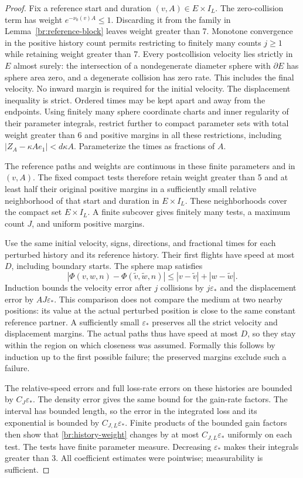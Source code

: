 \begin{proof}
Fix a reference start and duration \((v,A)\in E\times I_L\).
The zero-collision term has weight \(e^{-\nu_0(v)A}\le1\).
Discarding it from the family in Lemma~\ref{br:reference-block}
leaves weight greater than 7. Monotone convergence in the positive
history count permits restricting to finitely many counts
\(j\ge1\) while retaining weight greater than 7. Every postcollision
velocity lies strictly in \(E\) almost surely: the intersection of a
nondegenerate diameter sphere with \(\partial E\) has sphere area zero,
and a degenerate collision has zero rate. This includes the final
velocity. No inward margin is required for the initial velocity.
The displacement inequality
is strict. Ordered times may be kept apart and away from the endpoints.
Using finitely many sphere coordinate charts and inner regularity of
their parameter integrals, restrict further to compact parameter sets
with total weight greater than 6 and positive margins in all these
restrictions, including \(|Z_A-\kappa Ae_1|<d\kappa A\).
Parameterize the times as fractions of \(A\).

The reference paths and weights are continuous in these finite
parameters and in \((v,A)\). The fixed compact tests therefore retain
weight greater than 5 and at least half their original positive
margins in a sufficiently small relative neighborhood of that start
and duration in \(E\times I_L\).
These neighborhoods cover the compact set
\(E\times I_L\). A finite subcover gives finitely many tests, a maximum
count \(J\), and uniform positive margins.

Use the same initial velocity, signs, directions, and fractional times
for each perturbed history and its reference history. Their first
flights have speed at most \(D\), including boundary starts.
The sphere map satisfies
\[
|\Phi(v,w,n)-\Phi(\widetilde v,\widetilde w,n)|
\le |v-\widetilde v|+|w-\widetilde w|.
\]
Induction bounds the velocity error after \(j\) collisions by
\(j\varepsilon_*\) and the displacement error by \(AJ\varepsilon_*\).
This comparison does not compare the medium at two nearby positions:
its value at the actual perturbed position is close to the same
constant reference partner. A sufficiently small \(\varepsilon_*\)
preserves all the strict velocity and displacement margins. The
actual paths thus have speed at most \(D\), so they stay within the
region on which closeness was assumed. Formally this follows by
induction up to the first possible failure; the preserved margins
exclude such a failure.

The relative-speed errors and full loss-rate errors on these histories
are bounded by \(C_J\varepsilon_*\). The density error gives the same
bound for the gain-rate factors. The interval has bounded length,
so the error in the integrated loss and its exponential is bounded
by \(C_{J,L}\varepsilon_*\). Finite products of the bounded gain factors
then show that \eqref{br:history-weight} changes by at most
\(C_{J,L}\varepsilon_*\) uniformly on each test. The tests have finite
parameter measure. Decreasing \(\varepsilon_*\) makes their integrals
greater than 3. All coefficient estimates were pointwise; measurability
is sufficient.
\end{proof}

